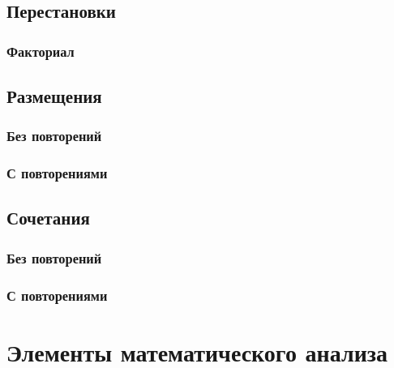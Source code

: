 \documentclass[
  letterpaper,
  DIV=11,
  numbers=noendperiod]{scrreprt}
\theoremstyle{definition}
\theoremstyle{remark}
\begin{document}
\section{Перестановки}\label{ux43fux435ux440ux435ux441ux442ux430ux43dux43eux432ux43aux438}

\subsection{Факториал}\label{ux444ux430ux43aux442ux43eux440ux438ux430ux43b}

\section{Размещения}\label{ux440ux430ux437ux43cux435ux449ux435ux43dux438ux44f}

\subsection{Без
повторений}\label{ux431ux435ux437-ux43fux43eux432ux442ux43eux440ux435ux43dux438ux439}

\subsection{С
повторениями}\label{ux441-ux43fux43eux432ux442ux43eux440ux435ux43dux438ux44fux43cux438}

\section{Сочетания}\label{ux441ux43eux447ux435ux442ux430ux43dux438ux44f}

\subsection{Без
повторений}\label{ux431ux435ux437-ux43fux43eux432ux442ux43eux440ux435ux43dux438ux439-1}

\subsection{С
повторениями}\label{ux441-ux43fux43eux432ux442ux43eux440ux435ux43dux438ux44fux43cux438-1}


\chapter{Элементы математического анализа}\label{math-analysis}
\end{document}
